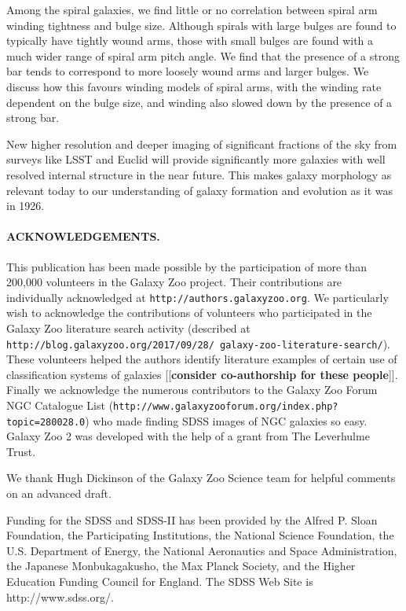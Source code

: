 \documentclass[usenatbib]{mn2e}
\newcommand{\comment}[2][todo]{{\color{#1}[[{\bf #2}]]}}
\begin{document}
Among the spiral galaxies, we find little or no correlation between spiral arm winding tightness and bulge size. Although spirals with large bulges are found to typically have tightly wound  arms, those with small bulges are found with a much wider range of spiral arm pitch angle. We find that the presence of a strong bar tends to correspond to more loosely wound arms and larger bulges. We discuss how this favours winding models of spiral arms, with the winding rate dependent on the bulge size, and winding also slowed down by the presence of a strong bar. 

 New higher resolution and deeper imaging of significant fractions of the sky from surveys like LSST and Euclid will provide significantly more galaxies with well resolved internal structure in the near future. This makes galaxy morphology as relevant today to our understanding of galaxy formation and evolution as it was in 1926. %
  
\paragraph*{ACKNOWLEDGEMENTS.} 

This publication has been made possible by the participation of more than 200,000 volunteers in the Galaxy Zoo project. Their contributions are individually acknowledged at \texttt{http://authors.galaxyzoo.org}.  We particularly wish to acknowledge the contributions of volunteers who participated in the Galaxy Zoo literature search activity (described at {\tt http://blog.galaxyzoo.org/2017/09/28/ galaxy-zoo-literature-search/}). These volunteers helped the authors identify literature examples of certain use of classification systems of galaxies \comment{consider co-authorship for these people}. Finally we acknowledge the numerous contributors to the Galaxy Zoo Forum NGC Catalogue List ({\tt http://www.galaxyzooforum.org/index.php?topic=280028.0}) who made finding SDSS images of NGC galaxies so easy. Galaxy Zoo 2 was developed with the help of a grant from The Leverhulme Trust.

We thank Hugh Dickinson of the Galaxy Zoo Science team for helpful comments on an advanced draft. 

Funding for the SDSS and SDSS-II has been provided by the Alfred P. Sloan Foundation, the Participating Institutions, the National Science Foundation, the U.S. Department of Energy, the National Aeronautics and Space Administration, the Japanese Monbukagakusho, the Max Planck Society, and the Higher Education Funding Council for England. The SDSS Web Site is http://www.sdss.org/. 
\end{document}
